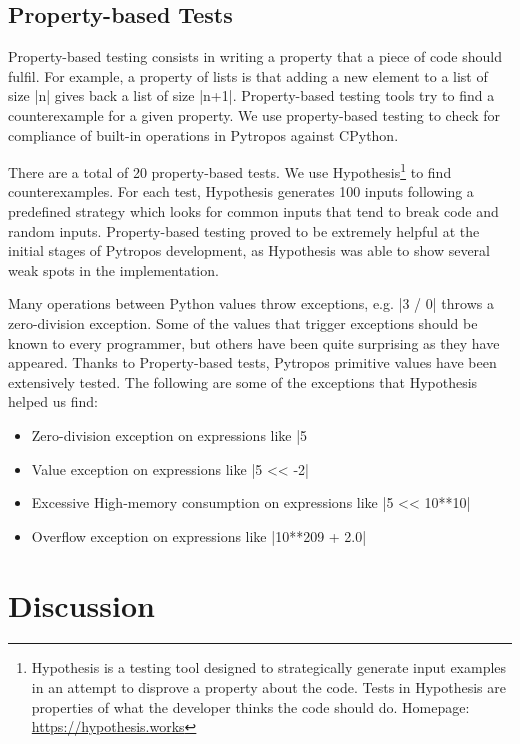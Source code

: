 \subsection{Property-based Tests}\label{property-based-tests}

Property-based testing consists in writing a property that a piece of code should fulfil.
For example, a property of lists is that adding a new element to a list of size \pycode|n|
gives back a list of size \pycode|n+1|. Property-based testing tools try to find a
counterexample for a given property. We use property-based testing to check for compliance
of built-in operations in Pytropos against CPython.

There are a total of 20 property-based tests. We use Hypothesis\footnote{Hypothesis is a
  testing tool designed to strategically generate input examples in an attempt to disprove
  a property about the code. Tests in Hypothesis are properties of what the developer
  thinks the code should do. Homepage: \url{https://hypothesis.works}}
to find counterexamples. For each test, Hypothesis
generates 100 inputs following a predefined strategy which looks for common inputs that
tend to break code and random inputs. Property-based testing proved to be extremely
helpful at the initial stages of Pytropos development, as Hypothesis was able to show
several weak spots in the implementation.

Many operations between Python values throw exceptions, e.g. \pycode|3 / 0| throws a
zero-division exception. Some of the values that trigger exceptions should be known to
every programmer, but others have been quite surprising as they have appeared. Thanks to
Property-based tests, Pytropos primitive values have been extensively tested. The following
are some of the exceptions that Hypothesis helped us find:

\begin{itemize}
\tightlist
\item Zero-division exception on expressions like \pycode|5 %
\item Value exception on expressions like \pycode|5 << -2|
\item Excessive High-memory consumption on expressions like \pycode|5 << 10**10|
\item Overflow exception on expressions like \pycode|10**209 + 2.0|
\end{itemize}

\section{Discussion}\label{discussion}


